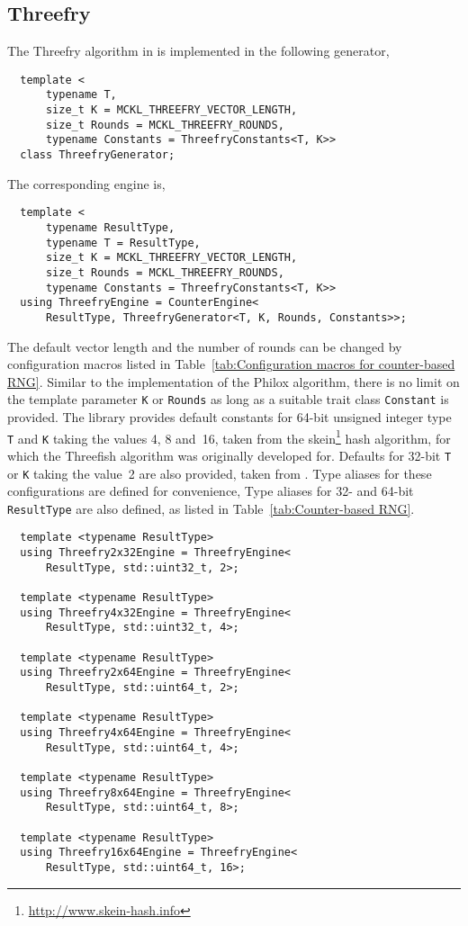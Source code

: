 \subsection{Threefry}
\label{sub:Threefry}

The Threefry algorithm in \cite{Salmon:2011um} is implemented in the following
generator,
\begin{Verbatim}
  template <
      typename T,
      size_t K = MCKL_THREEFRY_VECTOR_LENGTH,
      size_t Rounds = MCKL_THREEFRY_ROUNDS,
      typename Constants = ThreefryConstants<T, K>>
  class ThreefryGenerator;
\end{Verbatim}
The corresponding \rng engine is,
\begin{Verbatim}
  template <
      typename ResultType,
      typename T = ResultType,
      size_t K = MCKL_THREEFRY_VECTOR_LENGTH,
      size_t Rounds = MCKL_THREEFRY_ROUNDS,
      typename Constants = ThreefryConstants<T, K>>
  using ThreefryEngine = CounterEngine<
      ResultType, ThreefryGenerator<T, K, Rounds, Constants>>;
\end{Verbatim}
The default vector length and the number of rounds can be changed by
configuration macros listed in Table~\ref{tab:Configuration macros for
  counter-based RNG}. Similar to the implementation of the Philox algorithm,
there is no limit on the template parameter \verb|K| or \verb|Rounds| as long
as a suitable trait class \verb|Constant| is provided. The library provides
default constants for 64-bit unsigned integer type \verb|T| and \verb|K| taking
the values 4, 8 and~16, taken from the
skein\footnote{\url{http://www.skein-hash.info}} hash algorithm, for which the
Threefish algorithm was originally developed for. Defaults for 32-bit \verb|T|
or \verb|K| taking the value~2 are also provided, taken from
\cite{Salmon:2011um}. Type aliases for these configurations are defined for
convenience, Type aliases for 32- and 64-bit \verb|ResultType| are also
defined, as listed in Table~\ref{tab:Counter-based RNG}.
\begin{Verbatim}
  template <typename ResultType>
  using Threefry2x32Engine = ThreefryEngine<
      ResultType, std::uint32_t, 2>;

  template <typename ResultType>
  using Threefry4x32Engine = ThreefryEngine<
      ResultType, std::uint32_t, 4>;

  template <typename ResultType>
  using Threefry2x64Engine = ThreefryEngine<
      ResultType, std::uint64_t, 2>;

  template <typename ResultType>
  using Threefry4x64Engine = ThreefryEngine<
      ResultType, std::uint64_t, 4>;

  template <typename ResultType>
  using Threefry8x64Engine = ThreefryEngine<
      ResultType, std::uint64_t, 8>;

  template <typename ResultType>
  using Threefry16x64Engine = ThreefryEngine<
      ResultType, std::uint64_t, 16>;
\end{Verbatim}

